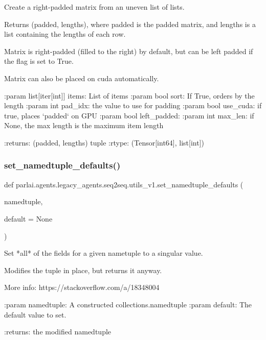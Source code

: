 \begin{DoxyVerb}Create a right-padded matrix from an uneven list of lists.

Returns (padded, lengths), where padded is the padded matrix, and lengths
is a list containing the lengths of each row.

Matrix is right-padded (filled to the right) by default, but can be
left padded if the flag is set to True.

Matrix can also be placed on cuda automatically.

:param list[iter[int]] items: List of items
:param bool sort: If True, orders by the length
:param int pad_idx: the value to use for padding
:param bool use_cuda: if true, places `padded` on GPU
:param bool left_padded:
:param int max_len: if None, the max length is the maximum item length

:returns: (padded, lengths) tuple
:rtype: (Tensor[int64], list[int])
\end{DoxyVerb}
 \mbox{\label{namespaceparlai_1_1agents_1_1legacy__agents_1_1seq2seq_1_1utils__v1_a17553492abb2e671bc3fc58e1e3a96b0}} 
\subsubsection{\texorpdfstring{set\+\_\+namedtuple\+\_\+defaults()}{set\_namedtuple\_defaults()}}
{\footnotesize\ttfamily def parlai.\+agents.\+legacy\+\_\+agents.\+seq2seq.\+utils\+\_\+v1.\+set\+\_\+namedtuple\+\_\+defaults (\begin{DoxyParamCaption}\item[{}]{namedtuple,  }\item[{}]{default = {\ttfamily None} }\end{DoxyParamCaption})}

\begin{DoxyVerb}Set *all* of the fields for a given nametuple to a singular value.

Modifies the tuple in place, but returns it anyway.

More info:
https://stackoverflow.com/a/18348004

:param namedtuple: A constructed collections.namedtuple
:param default: The default value to set.

:returns: the modified namedtuple
\end{DoxyVerb}
 

